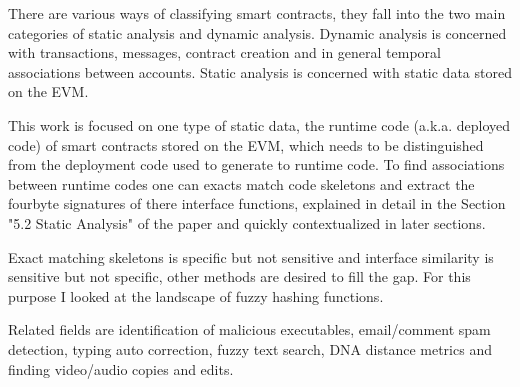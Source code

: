 \documentclass[../main.tex]{subfiles}
\begin{document}
There are various ways of classifying smart contracts, they fall into the two main categories of
static analysis and dynamic analysis.
Dynamic analysis is concerned with transactions, messages, contract creation and in general temporal associations between accounts.
Static analysis is concerned with static data stored on the EVM.

This work is focused on one type of static data, the runtime code (a.k.a. deployed code) of smart contracts stored on the EVM, which needs to be distinguished from the deployment code used to generate to runtime code.
To find associations between runtime codes one can exacts match code skeletons and extract the fourbyte signatures of there interface functions, explained in detail in the Section "5.2 Static Analysis" of the paper  and quickly contextualized in later sections.

Exact matching skeletons is specific but not sensitive and interface similarity is sensitive but not specific, other methods are desired to fill the gap. For this purpose I looked at the landscape of fuzzy hashing functions.

Related fields are identification of malicious executables, email/comment spam detection, typing auto correction, fuzzy text search, DNA distance metrics and finding video/audio copies and edits.

\end{document}
